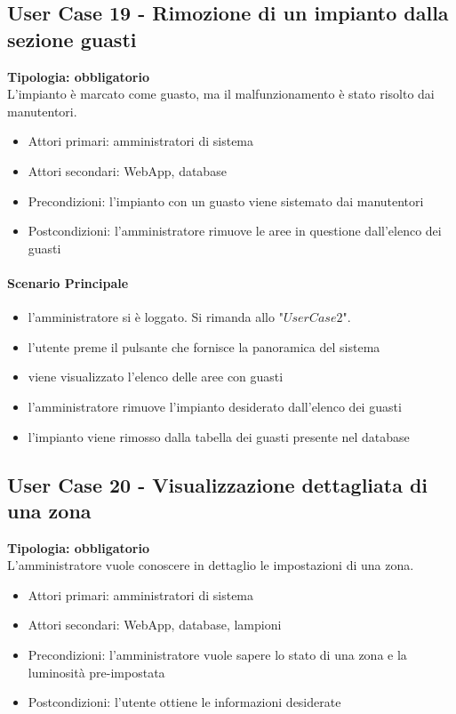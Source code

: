 \documentclass[12pt]{article}
\begin{document}
\subsection{User Case 19 - Rimozione di un impianto dalla sezione guasti}
\textbf{Tipologia: obbligatorio} \\
L'impianto è marcato come guasto, ma il malfunzionamento è stato risolto dai manutentori.
\begin{itemize}
	\item Attori primari: amministratori di sistema
	\item Attori secondari: WebApp, database
	\item Precondizioni: l'impianto con un guasto viene sistemato dai manutentori
	\item Postcondizioni: l'amministratore rimuove le aree in questione dall'elenco dei guasti
\end{itemize}
\paragraph{Scenario Principale}
\begin{itemize}
	\item l'amministratore si è loggato. Si rimanda allo "$User Case 2$".
	\item l'utente preme il pulsante che fornisce la panoramica del sistema
	\item viene visualizzato l'elenco delle aree con guasti
	\item l'amministratore rimuove l'impianto desiderato dall'elenco dei guasti
	\item l'impianto viene rimosso dalla tabella dei guasti presente nel database
\end{itemize}

\subsection{User Case 20 - Visualizzazione dettagliata di una zona}
\textbf{Tipologia: obbligatorio} \\
L'amministratore vuole conoscere in dettaglio le impostazioni di una zona.
\begin{itemize}
	\item Attori primari: amministratori di sistema
	\item Attori secondari: WebApp, database, lampioni
	\item Precondizioni: l'amministratore vuole sapere lo stato di una zona e la luminosità pre-impostata
	\item Postcondizioni: l'utente ottiene le informazioni desiderate
\end{itemize}
\end{document}
